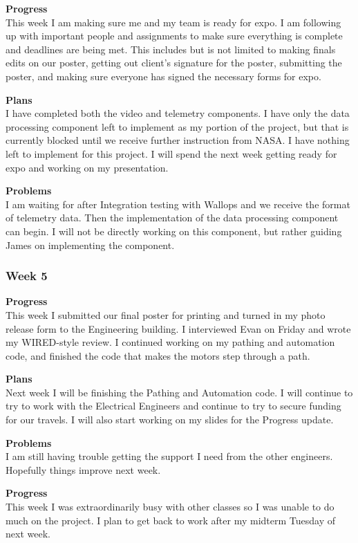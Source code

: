 \textbf{Progress} \\
This week I am making sure me and my team is ready for expo. I am following up with important people and assignments to make sure everything is complete and deadlines are being met. This includes but is not limited to making finals edits on our poster, getting out client's signature for the poster, submitting the poster, and making sure everyone has signed the necessary forms for expo.

\textbf{Plans} \\
I have completed both the video and telemetry components. I have only the data processing component left to implement as my portion of the project, but that is currently blocked until we receive further instruction from NASA. I have nothing left to implement for this project. I will spend the next week getting ready for expo and working on my presentation.

\textbf{Problems} \\
I am waiting for after Integration testing with Wallops and we receive the format of telemetry data. Then the implementation of the data processing component can begin. I will not be directly working on this component, but rather guiding James on implementing the component.

\subsubsection{Week 5}
\textbf{Progress} \\ 
This week I submitted our final poster for printing and turned in my photo release form to the Engineering building. I interviewed Evan on Friday and wrote my WIRED-style review. I continued working on my pathing and automation code, and finished the code that makes the motors step through a path.

\textbf{Plans} \\ 
Next week I will be finishing the Pathing and Automation code. I will continue to try to work with the Electrical Engineers and continue to try to secure funding for our travels. I will also start working on my slides for the Progress update.

\textbf{Problems} \\ 
I am still having trouble getting the support I need from the other engineers. Hopefully things improve next week.

\textbf{Progress} \\ 
This week I was extraordinarily busy with other classes so I was unable to do much on the project. I plan to get back to work after my midterm Tuesday of 
next week.

